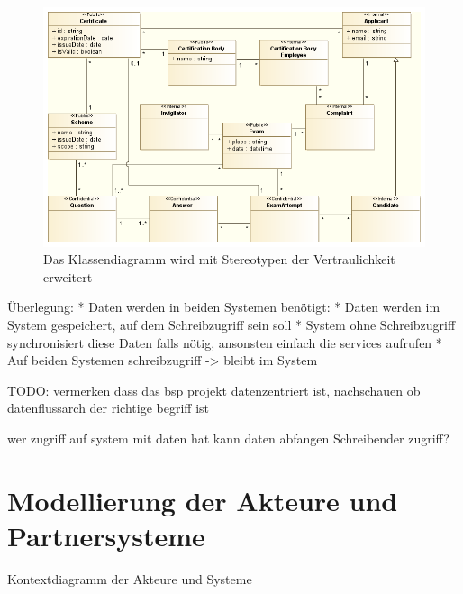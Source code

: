 \begin{figure}[!htbp]
    \centering
    \includegraphics[scale=0.5]{uml/classstereotyped.png}
    \caption{Das Klassendiagramm wird mit Stereotypen der Vertraulichkeit erweitert}
\end{figure}

Überlegung:
* Daten werden in beiden Systemen benötigt:
 * Daten werden im System gespeichert, auf dem Schreibzugriff sein soll
 * System ohne Schreibzugriff synchronisiert diese Daten falls nötig, ansonsten einfach die services aufrufen
 * Auf beiden Systemen schreibzugriff -> bleibt im System

 TODO: vermerken dass das bsp projekt datenzentriert ist, nachschauen ob datenflussarch der richtige begriff ist

wer zugriff auf system mit daten hat kann daten abfangen
Schreibender zugriff?


\section{Modellierung der Akteure und Partnersysteme}
Kontextdiagramm der Akteure und Systeme
